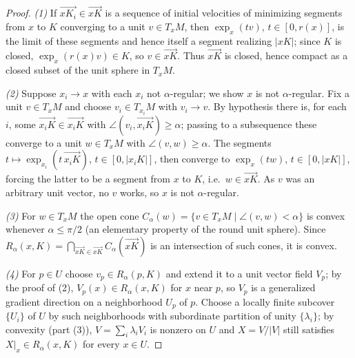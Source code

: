 \begin{proof}
  \emph{(1)} If $\overrightarrow{xK_i}\in\overrightarrow{xK}$ is a sequence of
  initial velocities of minimizing segments from $x$ to $K$ converging to a
  unit $v\in T_xM$, then $\exp_x(tv)$, $t\in[0,r(x)]$, is the limit of these
  segments and hence itself a segment realizing $|xK|$; since $K$ is closed,
  $\exp_x(r(x)v)\in K$, so $v\in\overrightarrow{xK}$. Thus
  $\overrightarrow{xK}$ is closed, hence compact as a closed subset of the
  unit sphere in $T_xM$.

  \emph{(2)} Suppose $x_i\to x$ with each $x_i$ not $\alpha$-regular; we show
  $x$ is not $\alpha$-regular. Fix a unit $v\in T_xM$ and choose $v_i\in
  T_{x_i}M$ with $v_i\to v$. By hypothesis there is, for each $i$, some
  $\overrightarrow{x_iK}\in\overrightarrow{x_iK}$ with
  $\angle(v_i,\overrightarrow{x_iK})\ge\alpha$; passing to a subsequence these
  converge to a unit $w\in T_xM$ with $\angle(v,w)\ge\alpha$. The segments
  $t\mapsto\exp_{x_i}(t\,\overrightarrow{x_iK})$, $t\in[0,|x_iK|]$, then
  converge to $\exp_x(tw)$, $t\in[0,|xK|]$, forcing the latter to be a segment
  from $x$ to $K$, i.e.\ $w\in\overrightarrow{xK}$. As $v$ was an arbitrary
  unit vector, no $v$ works, so $x$ is not $\alpha$-regular.

  \emph{(3)} For $w\in T_xM$ the open cone
  $C_\alpha(w)=\{v\in T_xM\mid\angle(v,w)<\alpha\}$ is convex whenever
  $\alpha\le\pi/2$ (an elementary property of the round unit sphere). Since
  $R_\alpha(x,K)=\bigcap_{\overrightarrow{xK}\in\overrightarrow{xK}}
  C_\alpha(\overrightarrow{xK})$ is an intersection of such cones, it is
  convex.

  \emph{(4)} For $p\in U$ choose $v_p\in R_\alpha(p,K)$ and extend it to a
  unit vector field $V_p$; by the proof of (2), $V_p(x)\in R_\alpha(x,K)$ for
  $x$ near $p$, so $V_p$ is a generalized gradient direction on a neighborhood
  $U_p$ of $p$. Choose a locally finite subcover $\{U_i\}$ of $U$ by such
  neighborhoods with subordinate partition of unity $\{\lambda_i\}$; by
  convexity (part (3)), $V=\sum_i\lambda_iV_i$ is nonzero on $U$ and
  $X=V/|V|$ still satisfies $X|_x\in R_\alpha(x,K)$ for every $x\in U$.


\end{proof}
